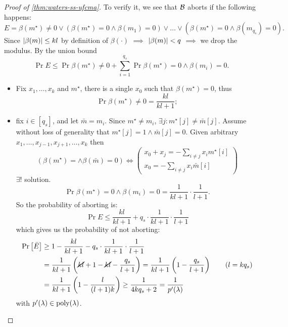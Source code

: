 \begin{proof}[Proof of \cref{thm:waters-ss-ufcma}]
	To verify it, we see that $\B$ aborts if the following happens:
	\begin{equation*}
		E = \beta(m^{\star}) \neq 0
		\lor
		(\beta(m^{\star}) = 0 \land \beta(m_1) = 0)
		\lor
		\dots
		\lor
		(\beta(m^{\star}) = 0 \land \beta(m_{q_s}) = 0).
	\end{equation*}
	Since $\abs{\beta(m)} \le k l$ by definition of $\beta(\cdot)$ $\implies$ $\abs{\beta(m)} < q$ $\implies$ we drop the modulus.
	By the union bound
	\begin{equation*}
		\Pr{E} \le \Pr{\beta(m^{\star}) \neq 0} +
		\sum_{i=1}^{q_s} \Pr{\beta(m^{\star}) = 0 \land \beta(m_i) = 0}.
	\end{equation*}
	\begin{itemize}
		\item Fix $x_1, \dots, x_k$ and $m^{\star}$, there is a single $x_0$ such that $\beta(m^{\star}) = 0$, thus
			\begin{equation*}
				\Pr{\beta(m^{\star}) \neq 0} = \frac{kl}{kl+1};
			\end{equation*}
		\item fix $i \in [q_s]$, and let $\bar{m} = m_i$.
			Since $m^{\star} \neq m_i$, $\exists j : m^{\star}[j] \neq \bar{m}[j]$.
			Assume without loss of generality that $m^{\star}[j] = 1 \land \bar{m}[j] = 0$.
			Given arbitrary $x_1, \dots, x_{j-1}, x_{j+1}, \dots, x_k$ then
			\begin{equation*}
				(\beta(m^{\star}) = \land \beta(\bar{m}) = 0)
				\iff
				\begin{pmatrix}
					x_0 + x_j = - \sum_{i \neq j} x_i m^{\star}[i] \\
					x_0 = - \sum_{i \neq j} x_i \bar{m}[i]
				\end{pmatrix}
			\end{equation*}
			$\exists !$ solution.
			\begin{equation*}
				\Pr{\beta(m^{\star}) = 0 \land \beta(m_i) = 0} = \frac{1}{kl + 1} \cdot \frac{1}{l + 1}.
			\end{equation*}
			So the probability of aborting is:
			\begin{equation*}
				\Pr{E} \le \frac{kl}{kl + 1} + q_s \cdot \frac{1}{kl+1} \cdot \frac{1}{l+1}
			\end{equation*}
			which gives us the probability of not aborting:
			\begin{align*}
				\Pr{\bar{E}} 
					& \ge
				1 - \frac{kl}{kl+1} - q_s \cdot \frac{1}{kl+1} \cdot \frac{1}{l+1}
					\\
					& =
				\frac{1}{kl+1} \left( \cancel{kl} + 1 - \cancel{kl} - \frac{q_s}{l+1} \right)
					=
				\frac{1}{kl+1} \left( 1 - \frac{q_s}{l+1} \right) \tag{$l = k q_s$}
					\\
					& =
				\frac{1}{kl+1} \left( 1 - \frac{l}{(l+1) k} \right)
					\ge
				\frac{1}{4 k q_s + 2}
					=
				\frac{1}{p'(\lambda)}
			\end{align*}
			with $p'(\lambda) \in \poly(\lambda)$.


\end{itemize}
\end{proof}
